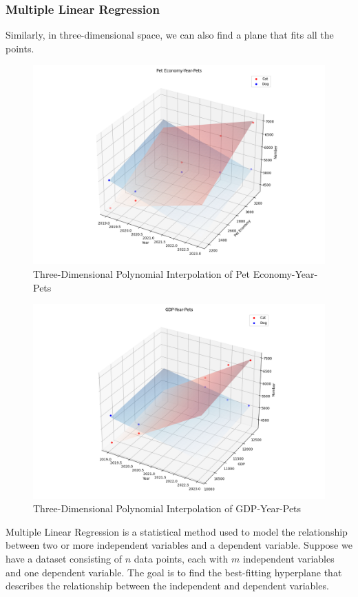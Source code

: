 \documentclass[withoutpreface,bwprint]{cumcmthesis} %
\begin{document}
\subsubsection{Multiple Linear Regression}
\par Similarly, in three-dimensional space, we can also find a plane that fits all the points.
\begin{figure}[htbp]
	\centering
	\includegraphics[width=.85\textwidth]{figure_4}
	\caption{Three-Dimensional Polynomial Interpolation of Pet Economy-Year-Pets}
\end{figure}
\begin{figure}[htbp]
	\centering
	\includegraphics[width=.85\textwidth]{figure_5}
	\caption{Three-Dimensional Polynomial Interpolation of GDP-Year-Pets}
\end{figure}
\begin{definition}
Multiple Linear Regression is a statistical method used to model the relationship between two or more independent variables and a dependent variable. Suppose we have a dataset consisting of $n$ data points, each with $m$ independent variables and one dependent variable. The goal is to find the best-fitting hyperplane that describes the relationship between the independent and dependent variables.
\end{definition}
\end{document}
